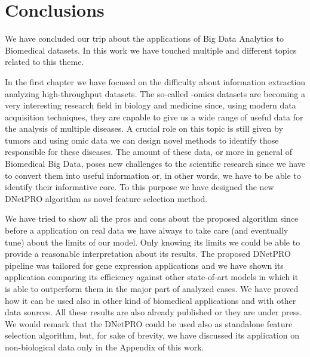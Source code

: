 \documentclass{standalone}
\begin{document}
\chapter*{Conclusions}\label{conclusions}

We have concluded our trip about the applications of Big Data Analytics to Biomedical datasets.
In this work we have touched multiple and different topics related to this theme.

In the first chapter we have focused on the difficulty about information extraction analyzing high-throughput datasets.
The so-called -omics datasets are becoming a very interesting research field in biology and medicine since, using modern data acquisition techniques, they are capable to give us a wide range of useful data for the analysis of multiple diseases.
A crucial role on this topic is still given by tumors and using omic data we can design novel methods to identify those responsible for these diseases.
The amount of these data, or more in general of Biomedical Big Data, poses new challenges to the scientific research since we have to convert them into useful information or, in other words, we have to be able to identify their informative core.
To this purpose we have designed the new \textsf{DNetPRO} algorithm as novel feature selection method.

We have tried to show all the pros and cons about the proposed algorithm since before a application on real data we have always to take care (and eventually tune) about the limits of our model.
Only knowing its limits we could be able to provide a reasonable interpretation about its results.
The proposed \textsf{DNetPRO} pipeline was tailored for gene expression applications and we have shown its application comparing its efficiency against other state-of-art models in which it is able to outperform them in the major part of analyzed cases.
We have proved how it can be used also in other kind of biomedical applications and with other data sources.
All these results are also already published or they are under press.
We would remark that the \textsf{DNetPRO} could be used also as standalone feature selection algorithm, but, for sake of brevity, we have discussed its application on non-biological data only in the Appendix of this work.
\end{document}
